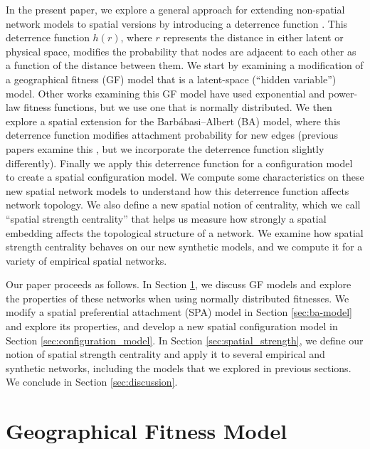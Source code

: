 \documentclass[%
 reprint,
 amsmath,amssymb,
 aps,
]{revtex4-1}
\begin{document}
In the present paper, we explore a general approach for extending non-spatial network models to spatial versions by introducing a deterrence function \cite{community2}. This deterrence function $h(r)$, where $r$ represents the distance in either latent or physical space, modifies the probability that nodes are adjacent to each other as a function of the distance between them. 
{\color{red}We start by examining a modification of a geographical fitness (GF) model \cite{yusuke} that is a latent-space (``hidden variable'') model. Other works examining this GF model \cite{geographical_threshold, geographical_threshold2} have used exponential and power-law fitness functions, but we use one that is normally distributed. 
We then explore a spatial extension for the Barb\'abasi--Albert (BA) model, where this deterrence function modifies attachment probability for new edges (previous papers examine this \cite{SPA1, SPA2, SPA3}, but we incorporate the deterrence function slightly differently). Finally we apply this deterrence function for a configuration model \cite{fosdick} to create a spatial configuration model.
We compute some characteristics on these new spatial network models to understand how this deterrence function affects network topology. }
We also define a new spatial notion of centrality, which we call ``spatial strength centrality'' that helps us measure how strongly a spatial embedding affects the topological structure of a network. We examine how spatial strength centrality behaves on our new synthetic models, and we compute it for a variety of empirical spatial networks.

Our paper proceeds as follows. In Section \ref{sec:fitness_model}, we discuss GF models and explore the properties of these networks when using normally distributed fitnesses. {\color{red}We modify a spatial preferential attachment (SPA) model in Section \ref{sec:ba-model} and explore its properties, and develop a new spatial configuration model in Section \ref{sec:configuration_model}.} In Section \ref{sec:spatial_strength}, we define our notion of spatial strength centrality and apply it to several empirical and synthetic networks, including the models that we explored in previous sections. We conclude in Section \ref{sec:discussion}.






\section{Geographical Fitness Model} \label{sec:fitness_model}
\end{document}
